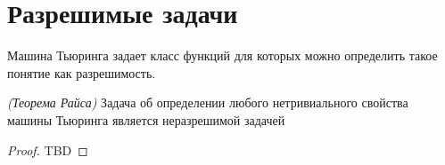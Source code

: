 \section{Разрешимые задачи}

Машина Тьюринга задает класс функций для которых можно определить
такое понятие как разрешимость.



\begin{theorem}
\emph{(Теорема Райса)}
Задача об определении любого нетривиального свойства машины Тьюринга
является неразрешимой задачей
\end{theorem}

\begin{proof}
TBD
\end{proof}

